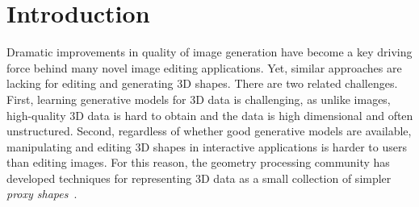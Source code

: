 \section{Introduction}
\label{sec:introduction}
Dramatic improvements in quality of image generation have become a key driving force behind many novel image editing applications.
Yet, similar approaches are lacking for editing and generating 3D shapes.
There are two related challenges.
First, learning generative models for 3D data is challenging, as unlike images, high-quality 3D data is hard to obtain and the data is high dimensional and often unstructured.
Second, regardless of whether good generative models are available,
manipulating and editing 3D shapes in interactive applications is harder to users than editing images.
For this reason, the geometry processing community has developed techniques for representing
3D data as a small collection of simpler \emph{proxy shapes}~\cite{ocd, acd, meshsegprim, abstractionshapes, variationalshape, obbcage, bmesh}.
